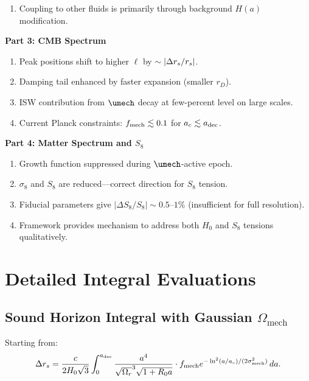 \begin{proposition}
\begin{enumerate}
\item Coupling to other fluids is primarily through background $H(a)$ modification.
\end{enumerate}

\textbf{Part 3: CMB Spectrum}
\begin{enumerate}
\item Peak positions shift to higher $\ell$ by $\sim |\Delta r_s/r_s|$.
\item Damping tail enhanced by faster expansion (smaller $r_D$).
\item ISW contribution from $\umech$ decay at few-percent level on large scales.
\item Current Planck constraints: $f_{\mathrm{mech}} \lesssim 0.1$ for $a_c \lesssim a_{\mathrm{dec}}$.
\end{enumerate}

\textbf{Part 4: Matter Spectrum and $S_8$}
\begin{enumerate}
\item Growth function suppressed during $\umech$-active epoch.
\item $\sigma_8$ and $S_8$ are reduced---correct direction for $S_8$ tension.
\item Fiducial parameters give $|\Delta S_8/S_8| \sim 0.5$--$1\%$ (insufficient for full resolution).
\item Framework provides mechanism to address both $H_0$ and $S_8$ tensions qualitatively.
\end{enumerate}

\end{proposition}



\appendix

\section{Detailed Integral Evaluations}
\label{app:integrals}

\subsection{Sound Horizon Integral with Gaussian $\Omega_{\mathrm{mech}}$}

Starting from:
\begin{equation}
\Delta r_s = \frac{c}{2H_0\sqrt{3}} \int_0^{a_{\mathrm{dec}}} \frac{a^4}{\sqrt{\Omega_r}^3 \sqrt{1+R_0 a}} \cdot f_{\mathrm{mech}} e^{-\ln^2(a/a_c)/(2\sigma_{\mathrm{mech}}^2)} \, da.
\end{equation}

